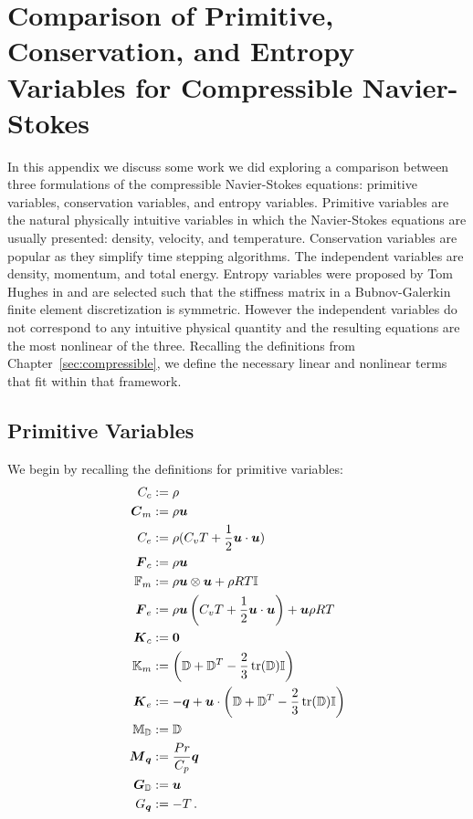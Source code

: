 \documentclass[Dissertation.tex]{subfiles}
\begin{document}
\graphicspath{{../Figures/}}
\chapter{Comparison of Primitive, Conservation, and Entropy Variables for Compressible Navier-Stokes}
\label{sec:VariableComparison}
In this appendix we discuss some work we did exploring a comparison between three formulations of the 
compressible Navier-Stokes equations: primitive variables, conservation variables, and entropy variables.
Primitive variables are the natural physically intuitive variables in which the Navier-Stokes 
equations are usually presented: density, velocity, and temperature.
Conservation variables are popular as they simplify time stepping algorithms. 
The independent variables are density, momentum, and total energy.
Entropy variables were proposed by Tom Hughes in \cite{HughesEntropyVariables}
and are selected such that the stiffness matrix in a Bubnov-Galerkin finite element 
discretization is symmetric. 
However the independent variables do not correspond to any intuitive physical quantity
and the resulting equations are the most nonlinear of the three.
Recalling the definitions from Chapter~\ref{sec:compressible}, we define the necessary
linear and nonlinear terms that fit within that framework.

\section{Primitive Variables}
We begin by recalling the definitions for primitive variables:
\begin{align*}
C_c&:=\rho\\
\boldsymbol C_m&:=\rho\boldsymbol u\\
C_e&:=\rho(C_v T+\frac{1}{2}\boldsymbol u\cdot\boldsymbol u)\\
\boldsymbol F_c&:=\rho\boldsymbol u\\
\mathbb{F}_m&:=\rho\boldsymbol u\otimes\boldsymbol u+\rho RT\mathbb{I}\\
\boldsymbol F_e&:=\rho\boldsymbol u\left( C_v T+\frac{1}{2}\boldsymbol u\cdot\boldsymbol u \right)+\boldsymbol u\rho RT\\
\boldsymbol K_c&:=\boldsymbol 0\\
\mathbb{K}_m&:=\left( \mathbb{D}+\mathbb{D}^T-\frac{2}{3}\operatorname*{tr}(\mathbb{D})\mathbb{I} \right)\\
\boldsymbol K_e&:=-\boldsymbol q+\boldsymbol u\cdot\left( \mathbb{D}+\mathbb{D}^T-\frac{2}{3}\operatorname*{tr}(\mathbb{D})\mathbb{I} \right)\\
\mathbb{M}_{\mathbb{D}}&:=\mathbb{D}\\
\boldsymbol M_{\boldsymbol q}&:=\frac{Pr}{C_p}\boldsymbol q\\
\boldsymbol G_{\mathbb{D}}&:=\boldsymbol u\\
G_{\boldsymbol q}&:=-T\,.
\end{align*}
\end{document}
